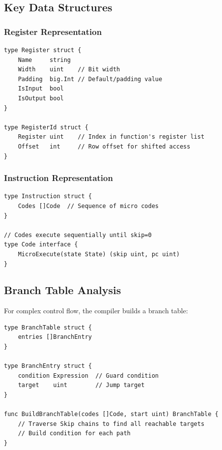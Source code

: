\documentclass[11pt,a4paper]{article}
\begin{document}
\subsection{Key Data Structures}

\subsubsection{Register Representation}

\begin{lstlisting}[style=golang,caption={Register Definition}]
type Register struct {
    Name     string
    Width    uint    // Bit width
    Padding  big.Int // Default/padding value
    IsInput  bool
    IsOutput bool
}

type RegisterId struct {
    Register uint    // Index in function's register list
    Offset   int     // Row offset for shifted access
}
\end{lstlisting}

\subsubsection{Instruction Representation}

\begin{lstlisting}[style=golang,caption={Instruction Structure}]
type Instruction struct {
    Codes []Code  // Sequence of micro codes
}

// Codes execute sequentially until skip=0
type Code interface {
    MicroExecute(state State) (skip uint, pc uint)
}
\end{lstlisting}

\subsection{Branch Table Analysis}

For complex control flow, the compiler builds a branch table:

\begin{lstlisting}[style=golang,caption={Branch Table Construction}]
type BranchTable struct {
    entries []BranchEntry
}

type BranchEntry struct {
    condition Expression  // Guard condition
    target    uint        // Jump target
}

func BuildBranchTable(codes []Code, start uint) BranchTable {
    // Traverse Skip chains to find all reachable targets
    // Build condition for each path
}
\end{lstlisting}
\end{document}
